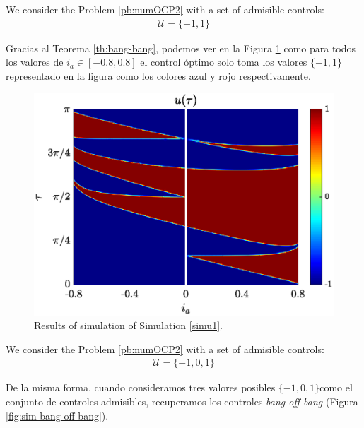 \documentclass[twocolumn]{autart}    %
\begin{document}
\vspace{1em}
\begin{simulation}\label{simu1}
We consider the Problem \ref{pb:numOCP2} with a set of admisible controls:
    \begin{gather}
    \mathcal{U} = \{-1,1\}
\end{gather}
\end{simulation}
Gracias al Teorema \ref{th:bang-bang}, podemos ver en la Figura \ref{fig:sim-bang-bang}  como para todos los valores de $i_a \in [-0.8,0.8]$ el control óptimo solo toma los valores $\{-1,1\}$ representado en la figura como los colores azul y rojo respectivamente.

\begin{figure}[ht!]
    \hspace{0.05em}
    \includegraphics[scale=0.525]{img/fig05.eps}
    \caption{Results of simulation of Simulation \ref{simu1}.}
    \label{fig:sim-bang-bang}
\end{figure} 

\vspace{1em}
\begin{simulation}\label{simu2}
    We consider the Problem \ref{pb:numOCP2} with a set of admisible controls:
    \begin{gather}
        \mathcal{U} = \{-1,0,1\}
    \end{gather}
\end{simulation}

De la misma forma, cuando consideramos tres valores posibles $\{-1,0,1\}$como el conjunto de controles admisibles, recuperamos los controles \emph{bang-off-bang} (Figura \ref{fig:sim-bang-off-bang}).
\end{document}
